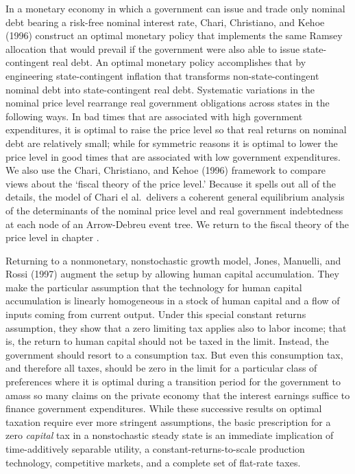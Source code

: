 %
In a monetary economy in which  a government  can issue and trade only
nominal debt bearing a risk-free nominal interest rate,
Chari, Christiano, and Kehoe (1996)
construct an optimal monetary policy that implements the same Ramsey allocation that
would prevail if the government were also  able to  issue state-contingent real debt.
An optimal monetary policy accomplishes that by engineering state-contingent inflation that  transforms
 non-state-contingent nominal  debt into
state-contingent real debt. Systematic variations in the nominal
price level rearrange real government obligations across states in the following ways.
In bad times that are associated with high government expenditures, it is
optimal to raise the price level so that real returns on nominal debt are relatively small;
while for symmetric reasons it is  optimal to lower the price level in
good times that are  associated with low government expenditures. We also
use the Chari, Christiano, and Kehoe (1996) framework to compare   views about the
`fiscal theory of the price level.' Because it  spells out all of the details, the model of Chari el al.\ delivers a
coherent general equilibrium analysis of the determinants of the
nominal price level and real government indebtedness at each node
of an Arrow-Debreu event tree. We return to the
fiscal theory of the price level in chapter .


  
Returning to a nonmonetary, nonstochastic growth model,
Jones, Manuelli, and Rossi (1997)
augment the setup by allowing human capital accumulation. They
make the  particular assumption that the technology for human
capital accumulation is linearly homogeneous in a stock of human
capital and a flow of  inputs coming from current output. Under
this special constant returns assumption, they show that a zero
limiting tax applies also to labor income; that is, the return to
human capital should not be taxed in the limit. Instead, the
government should resort to a consumption tax. But even this
consumption tax, and therefore all taxes, should be zero in the
limit for a particular class of preferences where it is optimal
during a transition period
for the government to amass so many
claims on the private economy that the interest earnings suffice
to finance government expenditures.
While these successive results on optimal taxation
require ever more stringent assumptions, the
basic prescription for a zero {\it capital\/} tax in a
nonstochastic steady state is an immediate implication of
time-additively separable utility, a
constant-returns-to-scale production technology,
competitive markets, and a complete set of flat-rate taxes.


